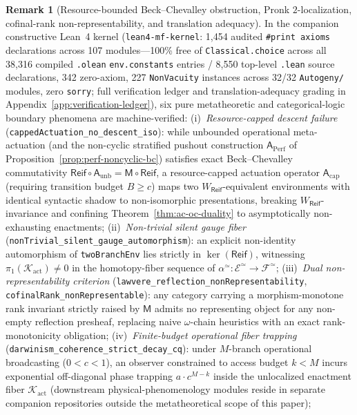\documentclass[11pt]{article}
\theoremstyle{plain}
\theoremstyle{definition}
\newtheorem{remark}[theorem]{Remark}
\newcommand{\cF}{\mathcal{F}}
\newcommand{\cE}{\mathcal{E}}
\begin{document}
\begin{remark}[Resource-bounded Beck--Chevalley obstruction, Pronk $2$-localization, cofinal-rank non-representability, and translation adequacy]\label{rem:toe-frontier-obstructions}
In the companion constructive Lean~4 kernel (\texttt{lean4-mf-kernel}: 1{,}454 audited \texttt{\#print axioms} declarations across 107 modules---100\% free of \texttt{Classical.choice} across all 38{,}316 compiled \texttt{.olean} \texttt{env.constants} entries / 8{,}550 top-level \texttt{.lean} source declarations, 342 zero-axiom, 227 \texttt{NonVacuity} instances across 32/32 \texttt{Autogeny/} modules, zero \texttt{sorry}; full verification ledger and translation-adequacy grading in Appendix~\ref{app:verification-ledger}), six pure metatheoretic and categorical-logic boundary phenomena are machine-verified:
(i)~\emph{Resource-capped descent failure} (\texttt{cappedActuation\_\allowbreak no\_\allowbreak descent\_\allowbreak iso}): while unbounded operational meta-actuation (and the non-cyclic stratified pushout construction $\mathsf{A}_{\mathrm{Perf}}$ of Proposition~\ref{prop:perf-noncyclic-bc}) satisfies exact Beck--Chevalley commutativity $\mathsf{Reif}\circ\mathsf{A}_{\mathrm{unb}} = \mathsf{M}\circ\mathsf{Reif}$, a resource-capped actuation operator $\mathsf{A}_{\mathrm{cap}}$ (requiring transition budget $B \ge c$) maps two $W_{\mathsf{Reif}}$-equivalent environments with identical syntactic shadow to non-isomorphic presentations, breaking $W_{\mathsf{Reif}}$-invariance and confining Theorem~\ref{thm:ac-oc-duality} to asymptotically non-exhausting enactments;
(ii)~\emph{Non-trivial silent gauge fiber} (\texttt{nonTrivial\_\allowbreak silent\_\allowbreak gauge\_\allowbreak automorphism}): an explicit non-identity automorphism of \texttt{twoBranchEnv} lies strictly in $\ker(\mathsf{Reif})$, witnessing $\pi_1(\mathcal{K}_{\mathrm{act}}) \neq 0$ in the homotopy-fiber sequence of $\alpha^{\simeq} : \cE^{\simeq} \to \cF^{\simeq}$;
(iii)~\emph{Dual non-representability criterion} (\texttt{lawvere\_\allowbreak reflection\_\allowbreak nonRepresentability}, \texttt{cofinalRank\_\allowbreak nonRepresentable}): any category carrying a morphism-monotone rank invariant strictly raised by $\mathsf{M}$ admits no representing object for any non-empty reflection presheaf, replacing naive $\omega$-chain heuristics with an exact rank-monotonicity obligation;
(iv)~\emph{Finite-budget operational fiber trapping} (\texttt{darwinism\_\allowbreak coherence\_\allowbreak strict\_\allowbreak decay\_\allowbreak cq}): under $M$-branch operational broadcasting ($0 < c < 1$), an observer constrained to access budget $k < M$ incurs exponential off-diagonal phase trapping $a\cdot c^{M-k}$ inside the unlocalized enactment fiber $\mathcal{K}_{\mathrm{act}}$ (downstream physical-phenomenology modules reside in separate companion repositories outside the metatheoretical scope of this paper);

\end{remark}
\end{document}
